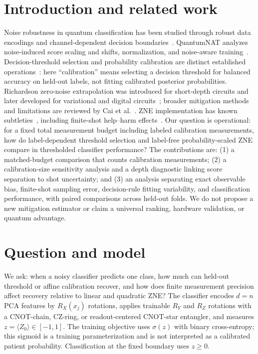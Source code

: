 \documentclass[conference]{IEEEtran}
\begin{document}
\section{Introduction and related work}
Noise robustness in quantum classification has been studied through robust data encodings and channel-dependent decision boundaries~\cite{larose2020}. QuantumNAT analyzes noise-induced score scaling and shifts, normalization, and noise-aware training~\cite{wang2022}. Decision-threshold selection and probability calibration are distinct established operations~\cite{hernandez2012,niculescu2005}: here ``calibration'' means selecting a decision threshold for balanced accuracy on held-out labels, not fitting calibrated posterior probabilities. Richardson zero-noise extrapolation was introduced for short-depth circuits and later developed for variational and digital circuits~\cite{temme2017,libenjamin2017,giurgica2020}; broader mitigation methods and limitations are reviewed by Cai et al.~\cite{cai2023}. ZNE implementation has known subtleties~\cite{majumdar2023}, including finite-shot help--harm effects~\cite{koester2026,scavino2026}. Our question is operational: for a fixed total measurement budget including labeled calibration measurements, how do label-dependent threshold selection and label-free probability-scaled ZNE compare in thresholded classifier performance? The contributions are: (1) a matched-budget comparison that counts calibration measurements; (2) a calibration-size sensitivity analysis and a depth diagnostic linking score separation to shot uncertainty; and (3) an analysis separating exact observable bias, finite-shot sampling error, decision-rule fitting variability, and classification performance, with paired comparisons across held-out folds. We do not propose a new mitigation estimator or claim a universal ranking, hardware validation, or quantum advantage.

\section{Question and model}
We ask: when a noisy classifier predicts one class, how much can held-out threshold or affine calibration recover, and how does finite measurement precision affect recovery relative to linear and quadratic ZNE? The classifier encodes $d=n$ PCA features by $R_X(x_j)$ rotations, applies trainable $R_Y$ and $R_Z$ rotations with a CNOT-chain, CZ-ring, or readout-centered CNOT-star entangler, and measures $z=\langle Z_0\rangle\in[-1,1]$. The training objective uses $\sigma(z)$ with binary cross-entropy; this sigmoid is a training parameterization and is not interpreted as a calibrated patient probability. Classification at the fixed boundary uses $z\geq0$.
\end{document}
